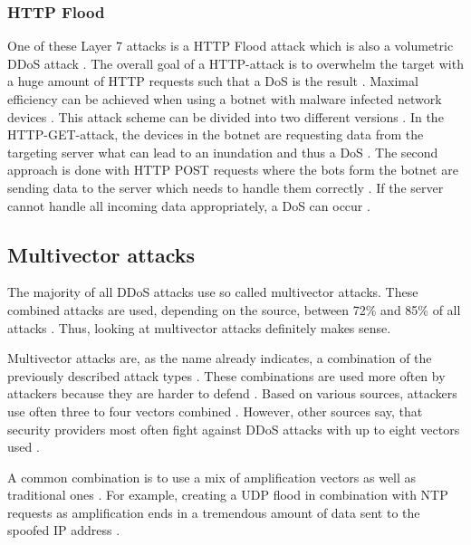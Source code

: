 \subsubsection*{HTTP Flood}
One of these Layer 7 attacks is a HTTP Flood attack which is also a volumetric DDoS attack \cite{Cloudflare-HTTP}. The overall goal of a HTTP-attack is to overwhelm the target with a huge amount of HTTP requests such that a DoS is the result \cite{Cloudflare-HTTP}. Maximal efficiency can be achieved when using a botnet with malware infected network devices \cite{Cloudflare-HTTP}. This attack scheme can be divided into two different versions \cite{Cloudflare-HTTP}. In the HTTP-GET-attack, the devices in the botnet are requesting data from the targeting server what can lead to an inundation and thus a DoS \cite{Cloudflare-HTTP}. The second approach is done with HTTP POST requests where the bots form the botnet are sending data to the server which needs to handle them correctly \cite{Cloudflare-HTTP}. If the server cannot handle all incoming data appropriately, a DoS can occur \cite{Cloudflare-HTTP}. 

\subsection{Multivector attacks}
The majority of all DDoS attacks use so called multivector attacks. These combined attacks are used, depending on the source, between 72\% and 85\% of all attacks \cite{Hostingtribunal-DDoSStatistics, Securelist-DDoSStatistics, Helpnetsecurity-DDoSStatistics}. Thus, looking at multivector attacks definitely makes sense. 

Multivector attacks are, as the name already indicates, a combination of the previously described attack types \cite{Corero-MultivectorDDoS}. These combinations are used more often by attackers because they are harder to defend \cite{Corero-MultivectorDDoS}. Based on various sources, attackers use often three to four vectors combined \cite{Corero-MultivectorDDoS, Helpnetsecurity-DDoSStatistics}. However, other sources say, that security providers most often fight against DDoS attacks with up to eight vectors used \cite{Corero-MultivectorDDoS}. 

A common combination is to use a mix of amplification vectors as well as traditional ones \cite{Symantec-MultivectorDDoS}. For example, creating a UDP flood in combination with NTP requests as amplification ends in a tremendous amount of data sent to the spoofed IP address \cite{Symantec-MultivectorDDoS}. 

